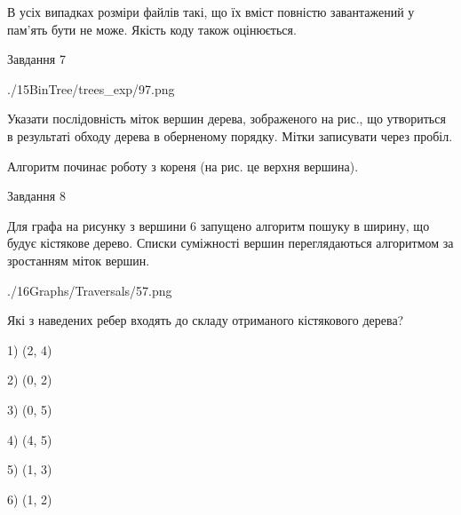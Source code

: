 \documentclass[12pt, ukrainian]{article}
\begin{document}
{В усіх випадках розміри файлів такі, що їх вміст повністю завантажений у пам'ять бути не може. Якість коду також оцінюється.



\vspace{10mm}\par

\newpage
\begin{minipage}[t]{9.7cm}
               
{\begin{center}Завдання {7}\end{center}}
\vspace{-6mm}

\begin{center}
	{./15BinTree/trees_exp/97.png}
\end{center}
Указати послідовність міток вершин дерева, зображеного на рис., що утвориться в результаті обходу дерева в оберненому порядку. Мітки записувати через пробіл.\par Алгоритм починає роботу з кореня (на рис. це верхня вершина).\par

\end{minipage}
\vline \hspace{8mm}
\begin{minipage}[t]{8.0cm}
               
{\begin{center}Завдання {8}\end{center}}
\vspace{-6mm}
Для графа на рисунку з вершини 6 запущено алгоритм пошуку в ширину, що будує кістякове дерево. Списки суміжності вершин переглядаються алгоритмом за зростанням міток вершин.\par
\begin{center}
	{./16Graphs/Traversals/57.png}
\end{center}
\par Які з наведених ребер входять до складу отриманого кістякового дерева?\par
1) (2, 4)\par
2) (0, 2)\par
3) (0, 5)\par
4) (4, 5)\par
5) (1, 3)\par
6) (1, 2)\par
{\vskip 15pt} \par


\end{minipage}}
\end{document}
